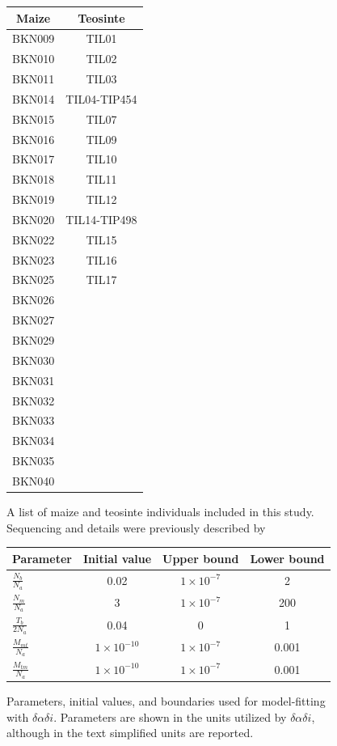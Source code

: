 \begin{figure}
  \begin{tabular}{c|c}
    \bf Maize & \bf Teosinte \\ \hline \hline
    BKN009 &  TIL01 \\
    BKN010 & TIL02 \\
    BKN011 & TIL03 \\
    BKN014 & TIL04-TIP454 \\
    BKN015 & TIL07 \\
    BKN016 & TIL09 \\
    BKN017 & TIL10 \\
    BKN018 & TIL11 \\
    BKN019 & TIL12 \\
    BKN020 & TIL14-TIP498 \\
    BKN022 & TIL15 \\
    BKN023 & TIL16 \\
    BKN025 & TIL17 \\
    BKN026 & \\
    BKN027 & \\
    BKN029 & \\
    BKN030 & \\
    BKN031 & \\
    BKN032 & \\
    BKN033 & \\
    BKN034 & \\
    BKN035 & \\
    BKN040 & \\
  \end{tabular} 
  \caption{ A list of maize and teosinte individuals included in this study. Sequencing and details were previously described by    \label{sTab:list} }
\end{figure}
\clearpage

\begin{figure}
  \def\arraystretch{2}
  \begin{tabular}{l|c|c|c}
    \bf Parameter & \bf Initial value & \bf Upper bound & \bf Lower bound\\ \hline 
    $\frac{N_b}{N_a}$ & 0.02 & $1\times10^{-7}$ & 2 \\ 
    $\frac{N_{m}}{N_a}$ & 3 & $1\times10^{-7}$ & 200 \\
    $\frac{T_b}{2N_a}$ & 0.04 & 0  & 1 \\ 
    $\frac{M_{mt}}{N_a}$ & $1\times10^{-10}$ & $1\times10^{-7}$ & 0.001 \\
    $\frac{M_{tm}}{N_a}$ & $1\times10^{-10}$ & $1\times10^{-7}$ & 0.001 \\
  \end{tabular} 
  \caption{ Parameters, initial values, and boundaries used for model-fitting with $\delta\alpha\delta{i}$. Parameters are shown in the units utilized by $\delta\alpha\delta{i}$, although in the text simplified units are reported.   \label{sTab:dadi} }
    \def\arraystretch{1} %
\end{figure}
\clearpage
